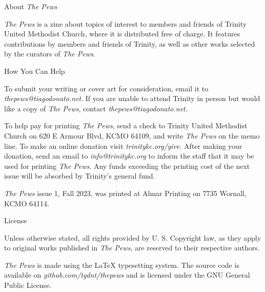 \documentclass[11pt]{memoir}
\begin{document}
\openleft{}
\pagestyle{empty}
\null
\clearpage

\vspace*{\fill}

\hspace{-2em}\small About \emph{The Pews}

\vspace{0.5em}
\scriptsize \emph{The Pews} is a zine about topics of interest to
members and friends of Trinity United Methodist Church, where
it is distributed free of charge. It features contributions by
members and friends of Trinity, as well as other works
selected by the curators of \emph{The Pews}.

\vspace{1.5em}
\hspace{-2em}\small How You Can Help

\vspace{0.5em} \scriptsize To submit your writing or cover art
for consideration, email it to
\mbox{\emph{thepews@tiagodonato.net}}. If you are unable to attend
Trinity in person but would like a copy of \emph{The Pews},
contact \emph{thepews@tiagodonato.net}.

To help pay for printing \emph{The Pews}, send a check to
Trinity United Methodist Church on 620 E Armour Blvd, KCMO
64109, and write \emph{The Pews} on the memo line. To make an
online donation visit \emph{trinitykc.org/give}. After making
your donation, send an email to \emph{info@trinitykc.org} to
inform the staff that it may be used for printing \emph{The
Pews}. Any funds exceeding the printing cost of the next issue
will be absorbed by Trinity's general fund.

\emph{The Pews} issue 1, Fall 2023, was printed at Almar
Printing on 7735 Wornall, KCMO 64114.

\vspace{1.5em}
\hspace{-2em}\small License

\vspace{0.5em}
\scriptsize Unless otherwise stated, all rights provided by
U. S. Copyright law, as they apply to original works published
in \emph{The Pews}, are reserved to their respective authors.

\emph{The Pews} is made using the \LaTeX{} typesetting
system. The source code is available on
\emph{github.com/tgdnt/thepews} and is licensed under the GNU
General Public License.
\end{document}

